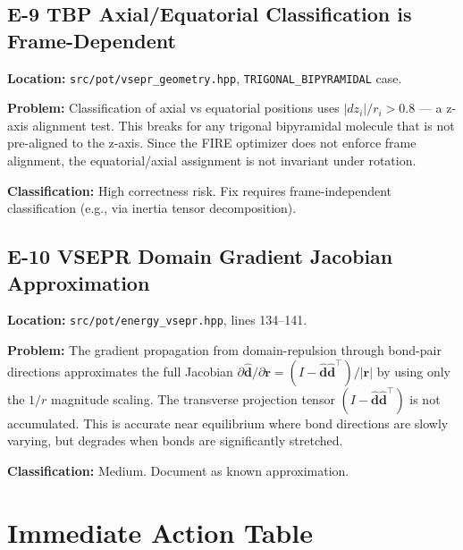 \documentclass[11pt,a4paper]{article}
\begin{document}
\subsection{E-9 \textemdash{} TBP Axial/Equatorial Classification is Frame-Dependent}
\begin{mdframed}[backgroundcolor=gray!8]
\textbf{Location:} \texttt{src/pot/vsepr\_geometry.hpp}, \texttt{TRIGONAL\_BIPYRAMIDAL} case.

\textbf{Problem:} Classification of axial vs equatorial positions uses
$|dz_i|/r_i > 0.8$ --- a z-axis alignment test. This breaks for any
trigonal bipyramidal molecule that is not pre-aligned to the z-axis.
Since the FIRE optimizer does not enforce frame alignment, the
equatorial/axial assignment is not invariant under rotation.

\textbf{Classification:} High correctness risk. Fix requires
frame-independent classification (e.g., via inertia tensor decomposition).
\end{mdframed}

\subsection{E-10 \textemdash{} VSEPR Domain Gradient Jacobian Approximation}
\begin{mdframed}[backgroundcolor=gray!8]
\textbf{Location:} \texttt{src/pot/energy\_vsepr.hpp}, lines 134--141.

\textbf{Problem:} The gradient propagation from domain-repulsion through
bond-pair directions approximates the full Jacobian
$\partial\hat{\mathbf{d}}/\partial\mathbf{r} = (I - \hat{\mathbf{d}}\hat{\mathbf{d}}^\top)/|\mathbf{r}|$
by using only the $1/r$ magnitude scaling. The transverse projection tensor
$(I - \hat{\mathbf{d}}\hat{\mathbf{d}}^\top)$ is not accumulated.
This is accurate near equilibrium where bond directions are slowly varying,
but degrades when bonds are significantly stretched.

\textbf{Classification:} Medium. Document as known approximation.
\end{mdframed}

\section{Immediate Action Table}
\label{sec:action_table}
\end{document}
